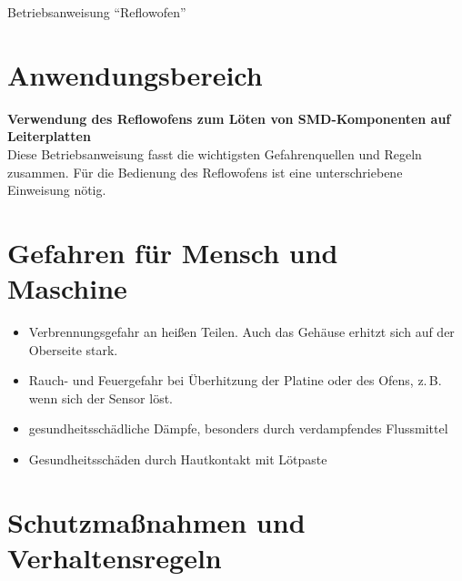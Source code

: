 \documentclass[fontsize=11pt]{scrartcl}
\begin{document}

\begin{center}
	\LARGE{Betriebsanweisung \enquote{Reflowofen}}
\end{center}


\section{Anwendungsbereich}

\begin{center}
\textbf{Verwendung des Reflowofens zum Löten von SMD-Komponenten auf Leiterplatten}\\
	Diese Betriebsanweisung fasst die wichtigsten Gefahrenquellen und Regeln zusammen. 	Für die Bedienung des Reflowofens ist eine unterschriebene Einweisung nötig.
\end{center}



\section{Gefahren für Mensch und Maschine}

\begin{itemize}
	\item Verbrennungsgefahr an heißen Teilen. Auch das Gehäuse erhitzt sich auf der Oberseite stark.
	\item Rauch- und Feuergefahr bei Überhitzung der Platine oder des Ofens, z.\,B. wenn sich der Sensor löst.
	\item gesundheitsschädliche Dämpfe, besonders durch verdampfendes Flussmittel
	\item Gesundheitsschäden durch Hautkontakt mit Lötpaste
\end{itemize}

\section{Schutzmaßnahmen und Verhaltensregeln}
\end{document}
